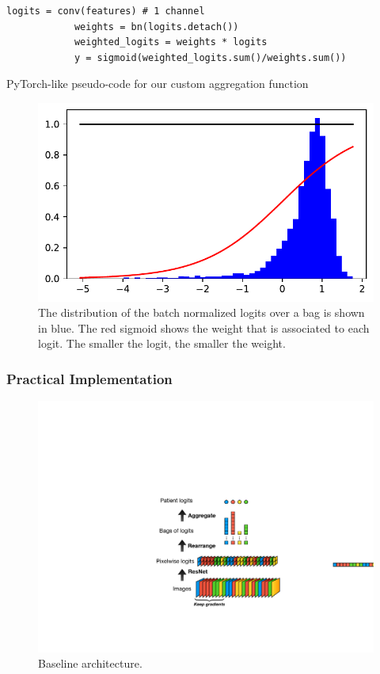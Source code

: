 \documentclass[final]{cvpr}
\begin{document}
	\begin{table}[h]
		\renewcommand\tablename{Pseudo-code}
		\begin{Verbatim}[fontsize=\footnotesize, samepage=true, frame=single]
			logits = conv(features) # 1 channel
			weights = bn(logits.detach())
			weighted_logits = weights * logits
			y = sigmoid(weighted_logits.sum()/weights.sum())
		\end{Verbatim}
		\caption{PyTorch-like pseudo-code for our custom aggregation function}
		\label{alg2}
	\end{table}
	
	\begin{figure}[h!]
		\begin{center}
			\includegraphics[width=0.95\linewidth]{fig/aggreg_2.pdf}
		\end{center}
		\caption{The distribution of the batch normalized logits over a bag is shown in blue. The red sigmoid shows the weight that is associated to each logit. The smaller the logit, the smaller the weight.}
		\label{fig:aggreg}
	\end{figure}
	
	\subsubsection{Practical Implementation}
	
	\begin{figure}[h!]
		\begin{center}
			\includegraphics[width=0.9\linewidth]{fig/graphic3.pdf}
		\end{center}
		\caption{Baseline architecture.}
		\label{fig:overview}
	\end{figure}
	
\end{document}

